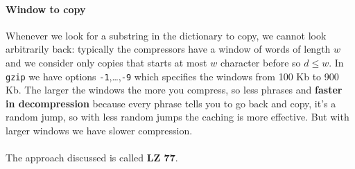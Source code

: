 \documentclass[10pt]{report}
\begin{document}
\paragraph{Window to copy} Whenever we look for a substring in the dictionary to copy, we cannot look arbitrarily back: typically the compressors have a window of words of length $w$ and we consider only copies that starts at most $w$ character before so $d\leq w$. In \texttt{gzip} we have options \texttt{-1},\ldots,\texttt{-9} which specifies the windows from 100 Kb to 900 Kb. The larger the windows the more you compress, so less phrases and \textbf{faster in decompression} because every phrase tells you to go back and copy, it's a random jump, so with less random jumps the caching is more effective. But with larger windows we have slower compression.\\\\
The approach discussed is called \textbf{LZ 77}.
\end{document}
